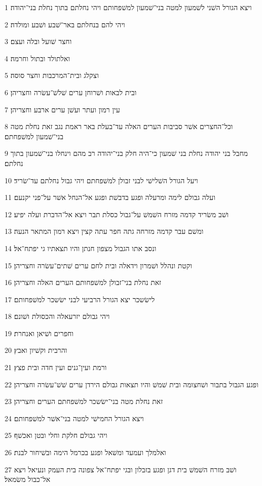 \par 1 ויצא הגורל השׁני לשׁמעון למטה בני־שׁמעון למשׁפחותם ויהי נחלתם בתוך נחלת בני־יהודה׃
\par 2 ויהי להם בנחלתם באר־שׁבע ושׁבע ומולדה׃
\par 3 וחצר שׁועל ובלה ועצם׃
\par 4 ואלתולד ובתול וחרמה׃
\par 5 וצקלג ובית־המרכבות וחצר סוסה׃
\par 6 ובית לבאות ושׁרוחן ערים שׁלשׁ־עשׂרה וחצריהן׃
\par 7 עין רמון ועתר ועשׁן ערים ארבע וחצריהן׃
\par 8 וכל־החצרים אשׁר סביבות הערים האלה עד־בעלת באר ראמת נגב זאת נחלת מטה בני־שׁמעון למשׁפחתם׃
\par 9 מחבל בני יהודה נחלת בני שׁמעון כי־היה חלק בני־יהודה רב מהם וינחלו בני־שׁמעון בתוך נחלתם׃
\par 10 ויעל הגורל השׁלישׁי לבני זבולן למשׁפחתם ויהי גבול נחלתם עד־שׂריד׃
\par 11 ועלה גבולם לימה ומרעלה ופגע בדבשׁת ופגע אל־הנחל אשׁר על־פני יקנעם׃
\par 12 ושׁב משׂריד קדמה מזרח השׁמשׁ על־גבול כסלת תבר ויצא אל־הדברת ועלה יפיע׃
\par 13 ומשׁם עבר קדמה מזרחה גתה חפר עתה קצין ויצא רמון המתאר הנעה׃
\par 14 ונסב אתו הגבול מצפון חנתן והיו תצאתיו גי יפתח־אל׃
\par 15 וקטת ונהלל ושׁמרון וידאלה ובית לחם ערים שׁתים־עשׂרה וחצריהן׃
\par 16 זאת נחלת בני־זבולן למשׁפחותם הערים האלה וחצריהן׃
\par 17 לישׂשכר יצא הגורל הרביעי לבני ישׂשכר למשׁפחותם׃
\par 18 ויהי גבולם יזרעאלה והכסולת ושׁונם׃
\par 19 וחפרים ושׁיאן ואנחרת׃
\par 20 והרבית וקשׁיון ואבץ׃
\par 21 ורמת ועין־גנים ועין חדה ובית פצץ׃
\par 22 ופגע הגבול בתבור ושׁחצומה ובית שׁמשׁ והיו תצאות גבולם הירדן ערים שׁשׁ־עשׂרה וחצריהן׃
\par 23 זאת נחלת מטה בני־ישׂשכר למשׁפחתם הערים וחצריהן׃
\par 24 ויצא הגורל החמישׁי למטה בני־אשׁר למשׁפחותם׃
\par 25 ויהי גבולם חלקת וחלי ובטן ואכשׁף׃
\par 26 ואלמלך ועמעד ומשׁאל ופגע בכרמל הימה ובשׁיחור לבנת׃
\par 27 ושׁב מזרח השׁמשׁ בית דגן ופגע בזבלון ובגי יפתח־אל צפונה בית העמק ונעיאל ויצא אל־כבול משׂמאל׃
